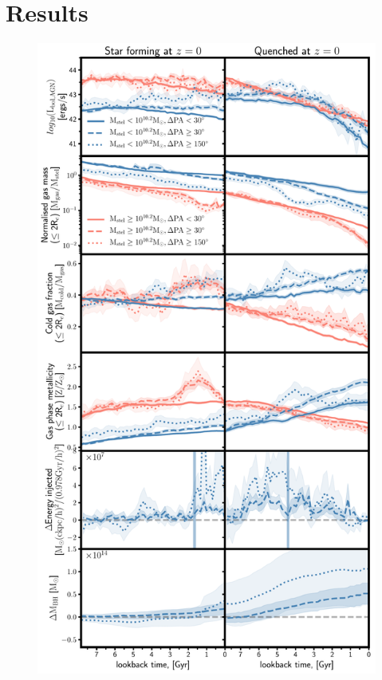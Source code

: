 \documentclass[fleqn,usenatbib]{mnras}
\begin{document}
\section{Results} \label{sec:results}
\begin{figure}
	\includegraphics[width=0.93\linewidth]{overall_population/time_evo_letter.pdf}

\end{figure}
\end{document}
